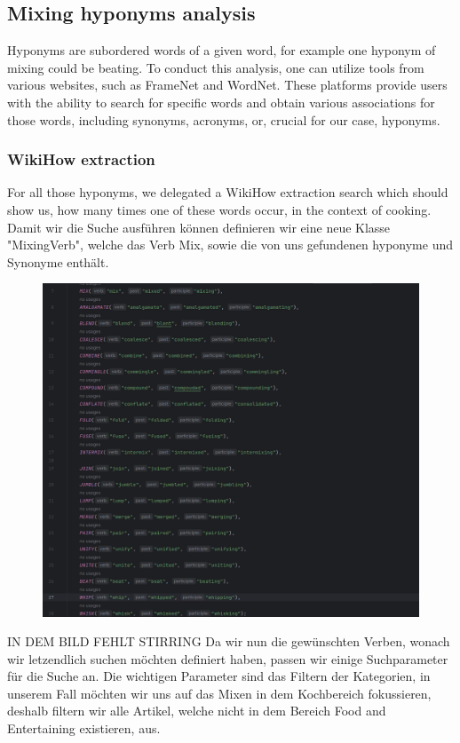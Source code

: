   \subsection*{Mixing hyponyms analysis} 
	Hyponyms are subordered words of a given word, for example one hyponym of mixing could be beating. 
  To conduct this analysis, one can utilize tools from various websites, such as FrameNet and WordNet. These platforms provide users with the ability to search for specific words and obtain various associations for those words, including synonyms, acronyms, or, crucial for our case, hyponyms.	
  \subsubsection*{WikiHow extraction}
  For all those hyponyms, we delegated a WikiHow extraction search which should show us, how many times one of these words occur, in the context of cooking.
	Damit wir die Suche ausführen können definieren wir eine neue Klasse "MixingVerb", welche das Verb Mix, sowie die von uns gefundenen hyponyme und Synonyme enthält.
  \begin{figure}[H]
    \includegraphics[scale=0.3]{Graphics/MixingVerbClass.png}
    \end{figure}
    IN DEM BILD FEHLT STIRRING
  Da wir nun die gewünschten Verben, wonach wir letzendlich suchen möchten definiert haben, passen wir einige Suchparameter für die Suche an.
  Die wichtigen Parameter sind das Filtern der Kategorien, in unserem Fall möchten wir uns auf das Mixen in dem Kochbereich fokussieren, deshalb filtern wir alle Artikel, welche nicht in dem Bereich Food and Entertaining existieren, aus.
